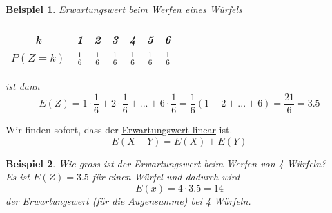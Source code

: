 \documentclass{report}
\newtheorem{myexample}{Beispiel}
\begin{document}
\begin{myexample}
Erwartungswert beim Werfen eines Würfels
\begin{center}\begin{tabular}{c | c c c c c c}
k & 1 & 2 & 3 & 4 & 5 & 6\\
\hline
$P(Z=k)$ & $\frac{1}{6}$ & $\frac{1}{6}$ & $\frac{1}{6}$ & $\frac{1}{6}$ & $\frac{1}{6}$ & $\frac{1}{6}$
\end{tabular}\end{center}
ist dann
\begin{equation}
E(Z) = 1 \cdot \frac{1}{6} + 2 \cdot \frac{1}{6} + ... + 6 \cdot \frac{1}{6} = \frac{1}{6}(1+2+...+6) = \frac{21}{6} = 3.5
\end{equation}
\end{myexample}
Wir finden sofort, dass der \underline{Erwartungswert linear} ist.
\begin{equation}
E(X+Y) = E(X) + E(Y)
\end{equation}
\begin{myexample}
Wie gross ist der Erwartungswert beim Werfen von 4 Würfeln?\\
Es ist $E(Z) = 3.5$ für einen Würfel und dadurch wird
\begin{equation}
E(x) = 4 \cdot 3.5 = 14
\end{equation}
der Erwartungswert (für die Augensumme) bei 4 Würfeln.
\end{myexample}
\end{document}
